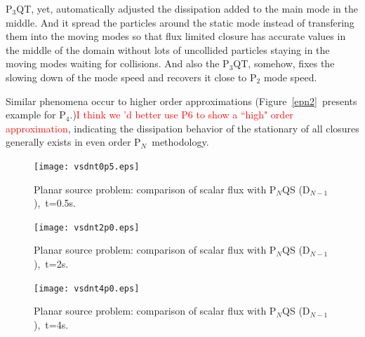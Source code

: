 \documentclass[review]{elsarticle}
\newcommand{\pn}{P$_N$}
\begin{document}
P$_3$QT, yet, automatically adjusted the dissipation added to the main mode in the middle. And it spread the particles around the static mode instead of transfering them into the moving modes so that flux limited closure has accurate values in the middle of the domain without lots of uncollided particles staying in the moving modes waiting for collisions. And also the P$_3$QT, somehow, fixes the slowing down of the mode speed and recovers it close to P$_2$ mode speed.

Similar phenomena occur to higher order approximations (Figure~\ref{epn2}~presents example for P$_4$.)\textcolor{red}{I think we 'd better use P6 to show a ``high" order approximation}, indicating the dissipation behavior of the stationary of all closures generally exists in even order \pn~methodology.

\begin{figure}[ht!]
	\begin{center}
		\hspace*{-3cm}\texttt{[image: vsdnt0p5.eps]}
		\caption[]{\label{dn0p5}Planar source problem: comparison of scalar flux with P$_N$QS (D$_{N-1}$),~t=0.5s.}%
	\end{center}
\end{figure}

\begin{figure}[ht!]
	\begin{center}
		\hspace*{-3cm}\texttt{[image: vsdnt2p0.eps]}
		\caption[]{\label{dn2p0}Planar source problem: comparison of scalar flux with P$_N$QS (D$_{N-1}$),~t=2s.}%
	\end{center}
\end{figure}

\begin{figure}[ht!]
	\begin{center}
		\hspace*{-3cm}\texttt{[image: vsdnt4p0.eps]}
		\caption[]{\label{dn4p0}Planar source problem: comparison of scalar flux with P$_N$QS (D$_{N-1}$),~t=4s.}%
	\end{center}
\end{figure}
\end{document}
